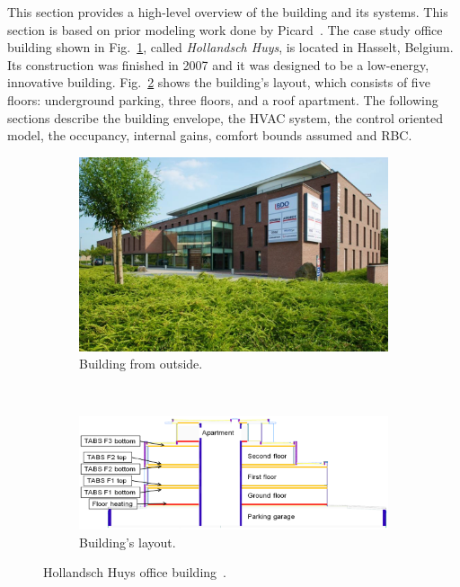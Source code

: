 \documentclass[10pt]{article}
\begin{document}
% 

This section  provides a high-level  overview  of the building and its systems. 
This section is based  on prior modeling work done by Picard~\cite{PicardPhD2018}.
The case study office building shown in Fig.~\ref{fig:HH:HH_building}, called \textit{Hollandsch Huys}, is located in Hasselt, Belgium. 
Its construction was finished in 2007 and it was designed to be a low-energy, innovative 
building.  
% 
Fig.~\ref{fig:HH:layout} shows the building's layout, which consists of five floors:  underground parking, three floors, and a roof apartment. 
The following sections describe the building envelope,
the HVAC system, the control oriented model,  the occupancy, internal gains, comfort bounds assumed and RBC.
\begin{figure}[!htbp]
    \centering
    \begin{subfigure}[b]{0.40\textwidth}
        \includegraphics[width=0.85 \textwidth]{fig/HH_building.eps}
\caption{Building from outside.}
        \label{fig:HH:HH_building}
    \end{subfigure}
    ~ %
    \begin{subfigure}[b]{0.58\textwidth}
        \includegraphics[width=1.00 \textwidth]{fig/HH_layout.eps}
        \caption{Building's layout.}
        \label{fig:HH:layout}
    \end{subfigure}
      \caption{Hollandsch Huys office building~\cite{Zacekova2013Ifmb}.}
    \label{fig:HH}
\end{figure}
\end{document}
